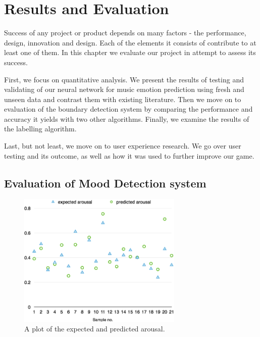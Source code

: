 
\chapter{Results and Evaluation} %

\label{Chapter6} %

\fancyhead[LE,RO]{\thepage}


Success of any project or product depends on many factors - the performance, design, innovation and design. Each of the elements it consists of contribute to at least one of them. 
In this chapter we evaluate our project in attempt to assess its success.

First, we focus on quantitative analysis. We present the results of testing and validating of our neural network for music emotion prediction using fresh and unseen data and contrast them with existing literature. Then we move on to evaluation of the boundary detection system by comparing the performance and accuracy it yields with two other algorithms. Finally, we examine the results of the labelling algorithm.

Last, but not least, we move on to user experience research. We go over user testing and its outcome, as well as how it was used to further improve our game. 

\vspace{10pt}

\section{Evaluation of Mood Detection system}

\begin{figure}[t]
    \includegraphics[width=0.7\textwidth]{Figures/finalarousal}
    \centering

  \caption{A plot of the expected and predicted arousal.}
  \label{fig:finalarousal}
\end{figure}



